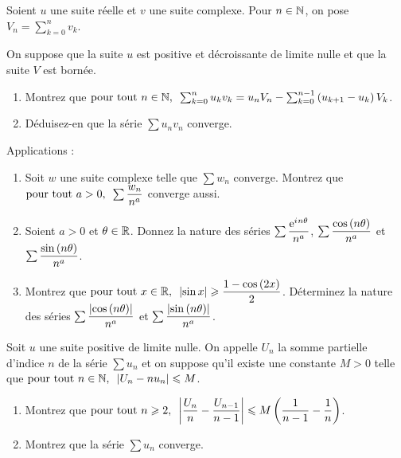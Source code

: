 \begin{exosss}
Soient \(u\) une suite réelle et \(v\) une suite complexe. Pour \(n\in\mathbb{N}\), on pose \(V_n=\sum_{k=0}^nv_k\).

On suppose que la suite \(u\) est positive et décroissante de limite nulle et que la suite \(V\) est bornée.

\begin{enumerate}[series=transformationAbel]
    \item Montrez que \(\quantifs{\tpt n\in\N}\sum_{k=0}^nu_kv_k=u_nV_n-\sum_{k=0}^{n-1}\paren{u_{k+1}-u_k}V_k\). \\
    \item Déduisez-en que la série \(\sum u_nv_n\) converge.
\end{enumerate}

Applications :

\begin{enumerate}[resume=transformationAbel]
    \item Soit \(w\) une suite complexe telle que \(\sum w_n\) converge. Montrez que \(\quantifs{\tpt a>0}\sum\dfrac{w_n}{n^a}\) converge aussi. \\
    \item Soient \(a>0\) et \(\theta\in\mathbb{R}\). Donnez la nature des séries \(\sum\dfrac{\mathrm{e}^{i\mkern1mu n\theta}}{n^a}\), \(\sum\dfrac{\cos\left(n\theta\right)}{n^a}\) et \(\sum\dfrac{\sin\left(n\theta\right)}{n^a}\). \\
    \item Montrez que \(\quantifs{\tpt x\in\R}\abs{\sin x}\geq\dfrac{1-\cos\paren{2x}}{2}\). Déterminez la nature des séries \(\sum\dfrac{\left\lvert\cos\left(n\theta\right)\right\rvert}{n^a}\) et \(\sum\dfrac{\left\lvert\sin\left(n\theta\right)\right\rvert}{n^a}\).
\end{enumerate}
\end{exosss}



\begin{exosss}[Exercice 21]
Soit \(u\) une suite positive de limite nulle. On appelle \(U_n\) la somme partielle d'indice \(n\) de la série \(\sum u_n\) et on suppose qu'il existe une constante \(M>0\) telle que \(\quantifs{\tpt n\in\N}\abs{U_n-nu_n}\leq M\).

\begin{enumerate}
    \item Montrez que \(\quantifs{\tpt n\geq2}\abs{\dfrac{U_n}{n}-\dfrac{U_{n-1}}{n-1}}\leq M\paren{\dfrac{1}{n-1}-\dfrac{1}{n}}\). \\
    \item Montrez que la série \(\sum u_n\) converge.
\end{enumerate}
\end{exosss}



